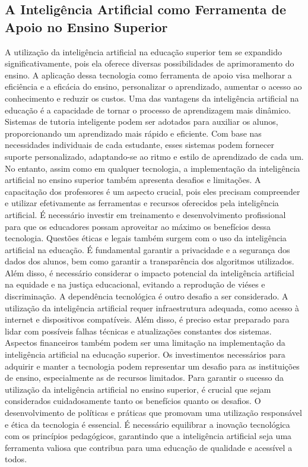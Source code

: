 \documentclass[conference]{IEEEtran}
\begin{document}
\subsection{A Inteligência Artificial como Ferramenta de Apoio no Ensino Superior\cite{b3}}
A utilização da inteligência artificial na educação superior tem se expandido significativamente, pois ela oferece diversas possibilidades de aprimoramento do ensino. A aplicação dessa tecnologia como ferramenta de apoio visa melhorar a eficiência e a eficácia do ensino, personalizar o aprendizado, aumentar o acesso ao conhecimento e reduzir os custos.
Uma das vantagens da inteligência artificial na educação é a capacidade de tornar o processo de aprendizagem mais dinâmico. Sistemas de tutoria inteligente podem ser adotados para auxiliar os alunos, proporcionando um aprendizado mais rápido e eficiente. Com base nas necessidades individuais de cada estudante, esses sistemas podem fornecer suporte personalizado, adaptando-se ao ritmo e estilo de aprendizado de cada um.
No entanto, assim como em qualquer tecnologia, a implementação da inteligência artificial no ensino superior também apresenta desafios e limitações. A capacitação dos professores é um aspecto crucial, pois eles precisam compreender e utilizar efetivamente as ferramentas e recursos oferecidos pela inteligência artificial. É necessário investir em treinamento e desenvolvimento profissional para que os educadores possam aproveitar ao máximo os benefícios dessa tecnologia.
Questões éticas e legais também surgem com o uso da inteligência artificial na educação. É fundamental garantir a privacidade e a segurança dos dados dos alunos, bem como garantir a transparência dos algoritmos utilizados. Além disso, é necessário considerar o impacto potencial da inteligência artificial na equidade e na justiça educacional, evitando a reprodução de viéses e discriminação.
A dependência tecnológica é outro desafio a ser considerado. A utilização da inteligência artificial requer infraestrutura adequada, como acesso à internet e dispositivos compatíveis. Além disso, é preciso estar preparado para lidar com possíveis falhas técnicas e atualizações constantes dos sistemas.
Aspectos financeiros também podem ser uma limitação na implementação da inteligência artificial na educação superior. Os investimentos necessários para adquirir e manter a tecnologia podem representar um desafio para as instituições de ensino, especialmente as de recursos limitados.
Para garantir o sucesso da utilização da inteligência artificial no ensino superior, é crucial que sejam considerados cuidadosamente tanto os benefícios quanto os desafios. O desenvolvimento de políticas e práticas que promovam uma utilização responsável e ética da tecnologia é essencial. É necessário equilibrar a inovação tecnológica com os princípios pedagógicos, garantindo que a inteligência artificial seja uma ferramenta valiosa que contribua para uma educação de qualidade e acessível a todos.
\end{document}
